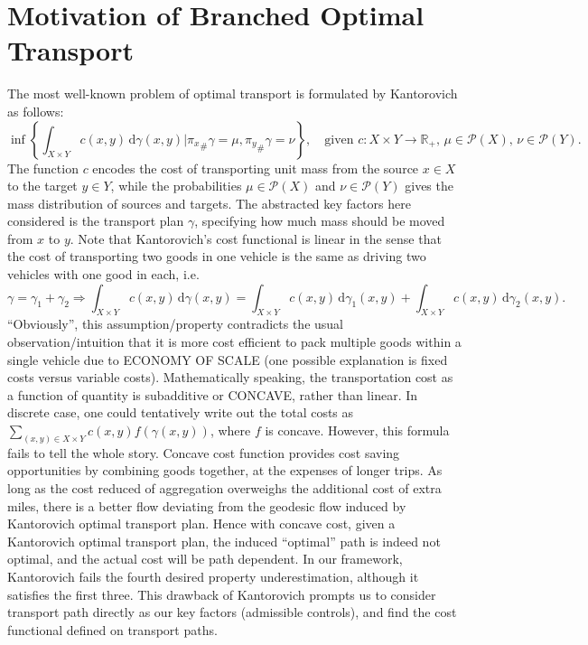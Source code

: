 \documentclass[fleqn]{article}
\theoremstyle{definition}
\theoremstyle{remark}
\renewcommand{\d}{\,\mathrm{d}} %
\renewcommand{\P}{\mathcal{P}} %
\begin{document}
\section{Motivation of Branched Optimal Transport} \label{sec:motivate}
The most well-known problem of optimal transport is formulated by Kantorovich as follows:
$$ \inf \left\{\int_{X \times Y} c(x,y) \d\gamma(x,y) | {\pi_x}_\# \gamma = \mu, {\pi_y}_\# \gamma = \nu \right\}, \quad \textrm{given } c:X\times Y \rightarrow \mathbb{R}_+, \, \mu\in\P(X), \, \nu\in\P(Y).$$
The function $c$ encodes the cost of transporting unit mass from the source $x\in X$ to the target $y\in Y$, while the probabilities $\mu\in\P(X)$ and $\nu\in\P(Y)$ gives the mass distribution of sources and targets. The abstracted key factors here considered is the transport plan $\gamma$, specifying how much mass should be moved from $x$ to $y$. Note that Kantorovich's cost functional is linear in the sense that the cost of transporting two goods in one vehicle is the same as driving two vehicles with one good in each, i.e. 
$$ \gamma=\gamma_1+\gamma_2 \Rightarrow \int_{X \times Y} c(x,y) \d\gamma(x,y) = \int_{X \times Y} c(x,y) \d\gamma_1(x,y) + \int_{X \times Y} c(x,y) \d\gamma_2(x,y).$$
``Obviously'', this assumption/property contradicts the usual observation/intuition that it is more cost efficient to pack multiple goods within a single vehicle due to ECONOMY OF SCALE (one possible explanation is fixed costs versus  variable costs). Mathematically speaking, the transportation cost as a function of quantity is subadditive or CONCAVE, rather than linear. In discrete case, one could tentatively write out the total costs as $\sum_{(x,y)\in X\times Y} c(x,y) f\left(\gamma(x,y)\right)$, where $f$ is concave. However, this formula fails to tell the whole story. Concave cost function provides cost saving opportunities by combining goods together, at the expenses of longer trips. As long as the cost reduced of aggregation overweighs the additional cost of extra miles, there is a better flow deviating from the geodesic flow induced by Kantorovich optimal transport plan. Hence with concave cost, given a Kantorovich optimal transport plan, the induced ``optimal'' path is indeed not optimal, and the actual cost will be path dependent. In our framework, Kantorovich fails the fourth desired property underestimation, although it satisfies the first three. This drawback of Kantorovich prompts us to consider transport path directly as our key factors (admissible controls), and find the cost functional defined on transport paths.
\end{document}
